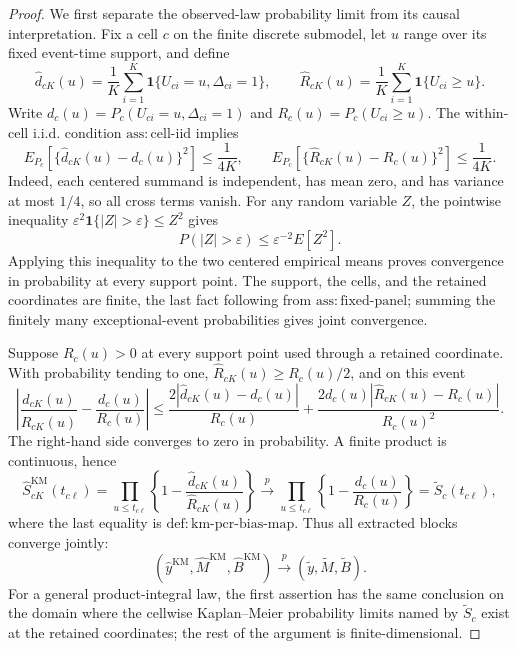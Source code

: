 \documentclass{article}
\begin{document}
\begin{proof}
We first separate the observed-law probability limit from its causal interpretation. Fix a cell \(c\) on the finite discrete submodel, let \(u\) range over its fixed event-time support, and define
\[
\widehat d_{cK}(u)=\frac1K\sum_{i=1}^K
 \mathbf 1\{U_{ci}=u,\Delta_{ci}=1\},\qquad
\widehat R_{cK}(u)=\frac1K\sum_{i=1}^K
 \mathbf 1\{U_{ci}\ge u\}.
\]
Write \(d_c(u)=P_c(U_{ci}=u,\Delta_{ci}=1)\) and \(R_c(u)=P_c(U_{ci}\ge u)\). The within-cell i.i.d. condition \(\mathrm{ass{:}cell\mbox{-}iid}\) implies
\[
E_{P_c}\!\left[\{\widehat d_{cK}(u)-d_c(u)\}^2\right]\le\frac1{4K},
\qquad
E_{P_c}\!\left[\{\widehat R_{cK}(u)-R_c(u)\}^2\right]\le\frac1{4K}.
\]
Indeed, each centered summand is independent, has mean zero, and has variance at most \(1/4\), so all cross terms vanish. For any random variable \(Z\), the pointwise inequality \(\varepsilon^2\mathbf 1\{|Z|>\varepsilon\}\le Z^2\) gives
\[
P(|Z|>\varepsilon)\le \varepsilon^{-2}E[Z^2].
\]
Applying this inequality to the two centered empirical means proves convergence in probability at every support point. The support, the cells, and the retained coordinates are finite, the last fact following from \(\mathrm{ass{:}fixed\mbox{-}panel}\); summing the finitely many exceptional-event probabilities gives joint convergence.

Suppose \(R_c(u)>0\) at every support point used through a retained coordinate. With probability tending to one, \(\widehat R_{cK}(u)\ge R_c(u)/2\), and on this event
\[
\left|\frac{\widehat d_{cK}(u)}{\widehat R_{cK}(u)}-
          \frac{d_c(u)}{R_c(u)}\right|
\le
\frac{2|\widehat d_{cK}(u)-d_c(u)|}{R_c(u)}
+\frac{2d_c(u)|\widehat R_{cK}(u)-R_c(u)|}{R_c(u)^2}.
\]
The right-hand side converges to zero in probability. A finite product is continuous, hence
\[
\widehat S^{\mathrm{KM}}_{cK}(t_{c\ell})
=\prod_{u\le t_{c\ell}}
 \left\{1-\frac{\widehat d_{cK}(u)}{\widehat R_{cK}(u)}\right\}
\xrightarrow{p}
\prod_{u\le t_{c\ell}}
 \left\{1-\frac{d_c(u)}{R_c(u)}\right\}
=\widetilde S_c(t_{c\ell}),
\]
where the last equality is \(\mathrm{def{:}km\mbox{-}pcr\mbox{-}bias\mbox{-}map}\). Thus all extracted blocks converge jointly:
\[
(\widehat y^{\mathrm{KM}},\widehat M^{\mathrm{KM}},\widehat B^{\mathrm{KM}})
\xrightarrow{p}(\widetilde y,\widetilde M,\widetilde B).
\]
For a general product-integral law, the first assertion has the same conclusion on the domain where the cellwise Kaplan--Meier probability limits named by \(\widetilde S_c\) exist at the retained coordinates; the rest of the argument is finite-dimensional.


\end{proof}
\end{document}
